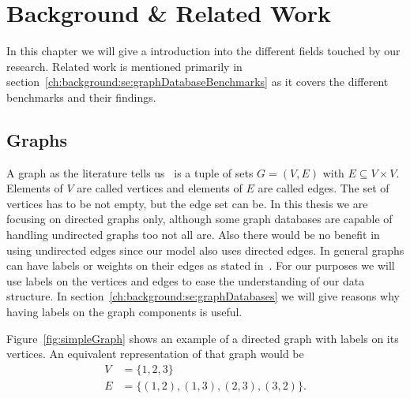 \chapter{Background \& Related Work}
\label{ch:background}
In this chapter we will give a introduction into the different fields touched by our research.
Related work is mentioned primarily in section~\ref{ch:background:se:graphDatabaseBenchmarks} as it covers the different benchmarks and their findings.

\section{Graphs}
\label{ch:background:se:graphs}
A graph as the literature tells us~\cite[89]{Worsch2011} is a tuple of sets $ G = (V, E) $ with $ E \subseteq V \times V $.
Elements of $ V $ are called vertices and elements of $ E $ are called edges.
The set of vertices has to be not empty, but the edge set can be.
In this thesis we are focusing on directed graphs only,
although some graph databases are capable of handling undirected graphs too not all are.
Also there would be no benefit in using undirected edges since our model also uses directed edges.
In general graphs can have labels or weights on their edges as stated in~\cite[99]{Worsch2011}.
For our purposes we will use labels on the vertices and edges to ease the understanding of our data structure.
In section~\ref{ch:background:se:graphDatabases} we will give reasons why having labels on the graph components is useful.

Figure~\ref{fig:simpleGraph} shows an example of a directed graph with labels on its vertices.
An equivalent representation of that graph would be
\begin{equation}
  \begin{aligned}
    V &= \{1, 2, 3\} \\
    E &= \{(1, 2), (1, 3), (2, 3), (3, 2)\}.
  \end{aligned}
\end{equation}

